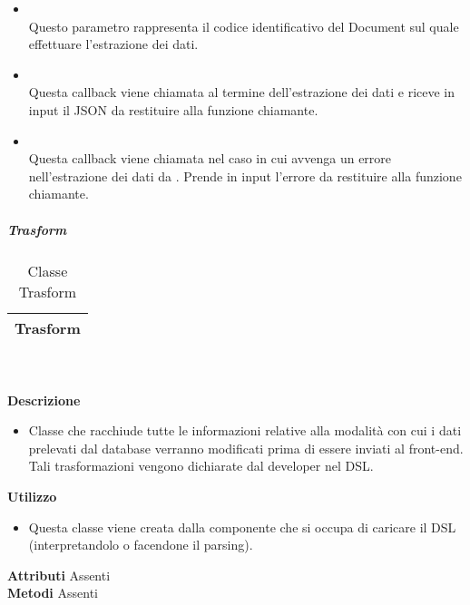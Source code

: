 \begin{itemize}
\begin{itemize}
\item[]  \\ Questo parametro rappresenta il codice identificativo del Document sul quale effettuare l'estrazione dei dati.
\item[]  \\ Questa callback viene chiamata al termine dell'estrazione dei dati e riceve in input il JSON da restituire alla funzione chiamante.
\item[]  \\ Questa callback viene chiamata nel caso in cui avvenga un errore nell'estrazione dei dati da . Prende in input l'errore da restituire alla funzione chiamante.
\end{itemize}
\end{itemize}

			\subparagraph{Trasform} 
\begin{table}[ht]
\begin{center}
\bgroup
	\setlength{\arrayrulewidth}{0.6mm}
	\def\arraystretch{1}
		\begin{tabular}{ | p{12cm} | }
				\hline  
					\centerline{\textbf{Trasform}}
		\\ \hline 
				\hline
				\hline
		
		\end{tabular}
\egroup
\caption{Classe Trasform}
\end{center}
\end{table} \textbf{\\ \\ Descrizione}
\begin{itemize}
\item[] Classe che racchiude tutte le informazioni relative alla modalità con cui i dati prelevati dal database verranno modificati prima di essere inviati al front-end.
Tali trasformazioni vengono dichiarate dal developer nel DSL.
\end{itemize} 
\textbf{Utilizzo}
\begin{itemize}
\item[] Questa classe viene creata dalla componente che si occupa di caricare il DSL (interpretandolo o facendone il parsing).
\end{itemize}
\textbf{Attributi}
Assenti \\
\textbf{Metodi}
Assenti \\

